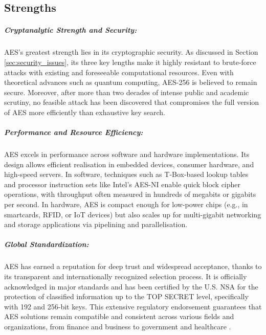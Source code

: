 \subsection{Strengths}

\subparagraph{Cryptanalytic Strength and Security:}

AES's greatest strength lies in its cryptographic security. As discussed in Section \ref{sec:security_issues}, its three key lengths make it highly resistant 
to brute-force attacks with existing and foreseeable computational resources. Even with theoretical advances such as quantum computing, 
AES-256 is believed to remain secure. Moreover, after more than two decades of intense public and academic scrutiny, no feasible attack 
has been discovered that compromises the full version of AES more efficiently than exhaustive key search.

\subparagraph{Performance and Resource Efficiency:}

AES excels in performance across software and hardware implementations. Its design allows efficient realisation in embedded devices, 
consumer hardware, and high-speed servers. In software, techniques such as T-Box-based lookup tables and processor instruction sets 
like Intel's AES-NI enable quick block cipher operations, with throughput often measured in hundreds of megabits or gigabits per second. 
In hardware, AES is compact enough for low-power chips (e.g., in smartcards, \Gls{RFID}, or \Gls{IoT} devices) but also scales up for multi-gigabit 
networking and storage applications via pipelining and parallelisation.

\subparagraph{Global Standardization:}

AES has earned a reputation for deep trust and widespread acceptance, thanks to its transparent and internationally recognized selection 
process. It is officially acknowledged in major standards and has been certified by the U.S. NSA for the protection of classified information 
up to the TOP SECRET level, specifically with 192 and 256-bit keys. This extensive regulatory endorsement guarantees that AES solutions remain 
compatible and consistent across various fields and organizations, from finance and business to government and healthcare \cite{cooper2025aes}.